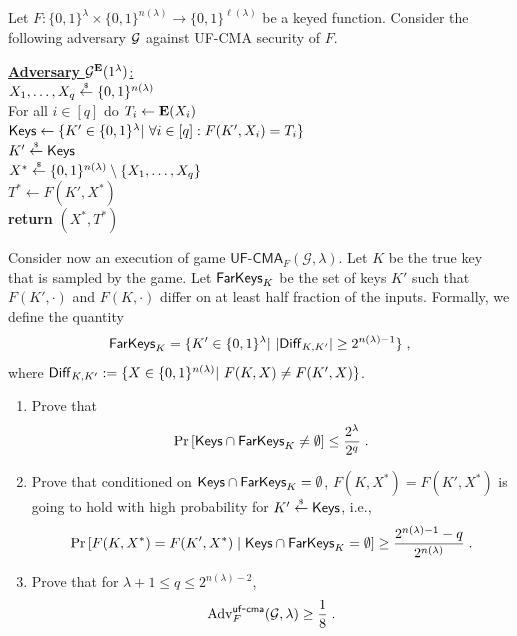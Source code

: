 \documentclass[11pt]{article}
\newcommand{\Prob}[1]{\Pr\left[#1 \right]}
\newcommand{\rsample}{\stackrel{\mbox{\tiny $\$$}}{\leftarrow}}
\newcommand{\bits}{\{0,1\}}
\renewcommand{\Pr}{\mathbb{P}}
\theoremstyle{plain}
\theoremstyle{definition}
\newcommand{\Adv}{\mathrm{Adv}}
\newcommand{\getsr}{\rsample}
\renewcommand{\Pr}{\mathrm{Pr}}
\begin{document}
 \noindent Let $F:\bits^{\lambda} \times \bits^{n(\lambda)} \to \bits^{\ell(\lambda)}$
 be a keyed function. Consider the following adversary $\mathcal{G}$ against UF-CMA security of $F$.
 \begin{center}
   \begin{minipage}[c]{0.5\textwidth}
       \underline{{\bf Adversary} $\mathcal{G}^{\mathbf{E}}(1^{\lambda})$:} \\[0.2ex]
       $X_1,\ldots,X_q \getsr \bits^{n(\lambda)}$\\
       For all $i\in [q]$ do $T_i\gets \mathbf{E}(X_i)$\\
       $\leftkeys\gets \{K' \in \bits^{\lambda}|~\forall i\in [q]: F(K',X_i)=T_i\}$\\
       $K'\getsr \leftkeys$\\
       $X^*\getsr \bits^{n(\lambda)} \setminus \{X_1,\ldots,X_q\}$\\
       $T^*\gets F(K',X^*)$\\
       {\bf return} $(X^*,T^*)$
   \end{minipage}

 \end{center}
Consider now an execution of game
$\mathsf{UF}\mbox{-}\mathsf{CMA}_{F}(\mathcal{G}, \lambda)$. Let $K$
be the true key that is sampled by the game. Let $\mathsf{FarKeys}_K$ be the
set of keys $K'$ such that $F(K', \cdot)$ and $F(K,\cdot)$ differ on at least
half fraction of the inputs. Formally, we define the quantity
\begin{align*}
  \farkeys_K =\{K' \in \bits^{\lambda}|~ |\diff_{K, K'}| \geq 2^{n(\lambda) - 1}\}\;,
\end{align*}
where $\diff_{K, K'} := \{X\in \bits^{n(\lambda)}  |~ F(K, X) \neq F(K', X)\}$.

    \begin{enumerate}

 \item Prove that
 \begin{align*}
   \Prob{\leftkeys \cap \farkeys_K \neq \emptyset} \leq  \frac{2^\lambda}{2^q}\;.
 \end{align*}
 \item Prove that conditioned on $\mathsf{Keys} \cap \mathsf{FarKeys}_K
   =\emptyset$, $F(K, X^*) = F(K', X^*)$ is going to hold with high
   probability for $K' \getsr \leftkeys$, i.e.,
 \begin{align*}
  \Prob{F(K, X^*) = F(K', X^*) \;|\; \leftkeys \cap \farkeys_K
   =\emptyset} \geq \frac{2^{n(\lambda) - 1}-q}{2^{n(\lambda)}}\;.
\end{align*}
 \item Prove that for $\lambda +1\leq q\leq 2^{n(\lambda) - 2}$,
 \begin{align*}
   \Adv^{\mathsf{uf}\mbox{-}\mathsf{cma}}_{F}(\advG, \lambda)\geq \frac{1}{8}\;.
 \end{align*}
 \end{enumerate}
\end{document}
